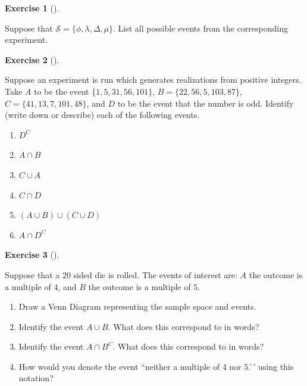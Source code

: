 \documentclass[
  letterpaper,
  DIV=11,
  numbers=noendperiod]{scrreprt}
\providecommand{\tightlist}{%
  \setlength{\itemsep}{0pt}\setlength{\parskip}{0pt}}\usepackage{longtable,booktabs,array}
\theoremstyle{definition}
\newtheorem{exercise}{Exercise}[chapter]
\theoremstyle{definition}
\theoremstyle{definition}
\theoremstyle{remark}
\begin{document}
\begin{exercise}[]\protect\hypertarget{exr-2.3}{}\label{exr-2.3}

Suppose that \(\mathcal{S} = \{\phi, \lambda, \Delta, \mu\}\). List all
possible events from the corresponding experiment.

\end{exercise}

\begin{exercise}[]\protect\hypertarget{exr-2.4}{}\label{exr-2.4}

Suppose an experiment is run which generates realizations from positive
integers. Take \(A\) to be the event \(\{1, 5, 31, 56, 101\}\),
\(B = \{22, 56, 5, 103, 87\}\), \(C = \{41, 13, 7, 101, 48\}\), and
\(D\) to be the event that the number is odd. Identify (write down or
describe) each of the following events.

\begin{enumerate}
\def\labelenumi{\alph{enumi}.}
\tightlist
\item
  \(D^C\)
\item
  \(A\cap B\)
\item
  \(C \cup A\)
\item
  \(C \cap D\)
\item
  \((A\cup B)\cup (C\cup D)\)
\item
  \(A\cap D^C\)
\end{enumerate}

\end{exercise}

\begin{exercise}[]\protect\hypertarget{exr-2.5}{}\label{exr-2.5}

Suppose that a \(20\) sided die is rolled. The events of interest are:
\(A\) the outcome is a multiple of \(4\), and \(B\) the outcome is a
multiple of \(5\).

\begin{enumerate}
\def\labelenumi{\alph{enumi}.}
\tightlist
\item
  Draw a Venn Diagram representing the sample space and events.
\item
  Identify the event \(A \cup B\). What does this correspond to in
  words?
\item
  Identify the event \(A \cap B^C\). What does this correspond to in
  words?
\item
  How would you denote the event ``neither a multiple of \(4\) nor
  \(5\).'\,' using this notation?
\end{enumerate}

\end{exercise}
\end{document}
